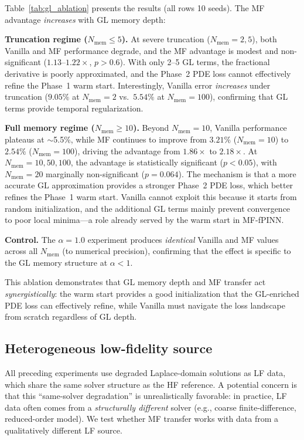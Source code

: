 \documentclass[preprint,12pt]{elsarticle}
\begin{document}
Table~\ref{tab:gl_ablation} presents the results (all rows 10 seeds). The MF advantage \emph{increases} with GL memory depth:

\textbf{Truncation regime ($N_{\mathrm{mem}} \leq 5$).} At severe truncation ($N_{\mathrm{mem}} = 2, 5$), both Vanilla and MF performance degrade, and the MF advantage is modest and non-significant ($1.13$--$1.22\times$, $p > 0.6$). With only 2--5 GL terms, the fractional derivative is poorly approximated, and the Phase~2 PDE loss cannot effectively refine the Phase~1 warm start. Interestingly, Vanilla error \emph{increases} under truncation ($9.05\%$ at $N_{\mathrm{mem}} = 2$ vs.\ $5.54\%$ at $N_{\mathrm{mem}} = 100$), confirming that GL terms provide temporal regularization.

\textbf{Full memory regime ($N_{\mathrm{mem}} \geq 10$).} Beyond $N_{\mathrm{mem}} = 10$, Vanilla performance plateaus at $\sim$5.5\%, while MF continues to improve from $3.21\%$ ($N_{\mathrm{mem}} = 10$) to $2.54\%$ ($N_{\mathrm{mem}} = 100$), driving the advantage from $1.86\times$ to $2.18\times$. At $N_{\mathrm{mem}} = 10, 50, 100$, the advantage is statistically significant ($p < 0.05$), with $N_{\mathrm{mem}} = 20$ marginally non-significant ($p = 0.064$). The mechanism is that a more accurate GL approximation provides a stronger Phase~2 PDE loss, which better refines the Phase~1 warm start. Vanilla cannot exploit this because it starts from random initialization, and the additional GL terms mainly prevent convergence to poor local minima---a role already served by the warm start in MF-fPINN.

\textbf{Control.} The $\alpha = 1.0$ experiment produces \emph{identical} Vanilla and MF values across all $N_{\mathrm{mem}}$ (to numerical precision), confirming that the effect is specific to the GL memory structure at $\alpha < 1$.

This ablation demonstrates that GL memory depth and MF transfer act \emph{synergistically}: the warm start provides a good initialization that the GL-enriched PDE loss can effectively refine, while Vanilla must navigate the loss landscape from scratch regardless of GL depth.

\subsection{Heterogeneous low-fidelity source}
\label{sec:heterogeneous}

All preceding experiments use degraded Laplace-domain solutions as LF data, which share the same solver structure as the HF reference. A potential concern is that this ``same-solver degradation'' is unrealistically favorable: in practice, LF data often comes from a \emph{structurally different} solver (e.g., coarse finite-difference, reduced-order model). We test whether MF transfer works with data from a qualitatively different LF source.
\end{document}
